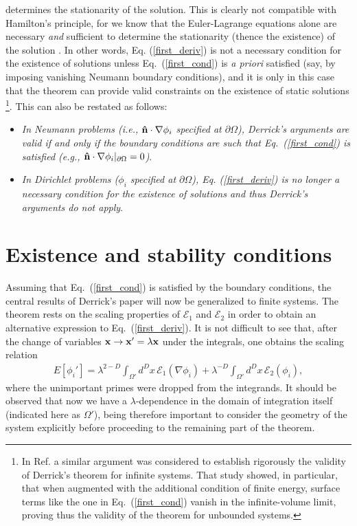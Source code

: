 \documentclass[a4paper,prd,twocolumn,showpacs,amsmath]{revtex4}
\newcommand{\vecx}{{\bf x}}
\newcommand{\vecn}{{\bf \hat n}}
\newcommand{\domega}{\partial \Omega}
\newcommand{\E}{{\mathcal E}}
\begin{document}
determines the stationarity of the solution. This is clearly not compatible with Hamilton's principle, for
we know that the Euler-Lagrange equations alone are necessary {\em and} sufficient to determine the stationarity
(thence the existence) of the solution \cite{lanczos}. In other words, Eq. (\ref{first_deriv}) is not
a necessary condition for the existence of solutions unless Eq.~(\ref{first_cond}) is {\em a priori}
satisfied (say, by imposing vanishing Neumann boundary conditions), and it is
only in this case that the theorem can provide valid constraints on the existence of static solutions
\footnote{In Ref. \cite{requardt} a similar argument was considered to establish rigorously the validity of
Derrick's theorem for infinite systems. That study showed, in particular, that when augmented with the
additional condition of finite energy, surface terms like the one in Eq.~(\ref{first_cond}) vanish in
the infinite-volume limit, proving thus the validity of the theorem for unbounded systems.}.
This can also be restated as follows:

\begin{itemize}
\item {\em In Neumann problems (i.e., $\vecn\cdot\nabla\phi_i$ specified at
$\domega$), Derrick's arguments are valid if and only if the boundary conditions are such that
Eq.~(\ref{first_cond}) is satisfied (e.g., $\vecn\cdot\nabla\phi_i|_{\domega}=0$)}.

\item {\em In Dirichlet problems ($\phi_i$ specified at $\domega$), Eq. (\ref{first_deriv}) is no longer
a necessary condition for the existence of solutions and thus Derrick's arguments do not apply}.
\end{itemize}

\section{Existence and stability conditions} \label{exist-stab}

Assuming that Eq.~(\ref{first_cond}) is satisfied by the boundary conditions, the central results
of Derrick's paper will now be generalized to finite systems. The theorem rests on the
scaling properties of $\E_1$ and $\E_2$ in order to obtain an alternative expression to Eq.~(\ref{first_deriv}).
It is not difficult to see that, after the change of variables $\vecx\to\vecx'=\lambda\vecx$ under the integrals,
one obtains the scaling relation
\begin{align}
  E[\phi_i'] = \lambda^{2-D} \int_{\Omega'} d^D x \,\E_1(\nabla \phi_i) +
    \lambda^{-D} \int_{\Omega'} d^D x \,\E_2(\phi_i), \label{E_phi_prime}
\end{align}
where the unimportant primes were dropped from the integrands. It should be observed that now we have a
$\lambda$-dependence in the domain of integration itself (indicated
here as $\Omega'$), being therefore important to consider the geometry of
the system explicitly before proceeding to the remaining part of the theorem.
\end{document}
